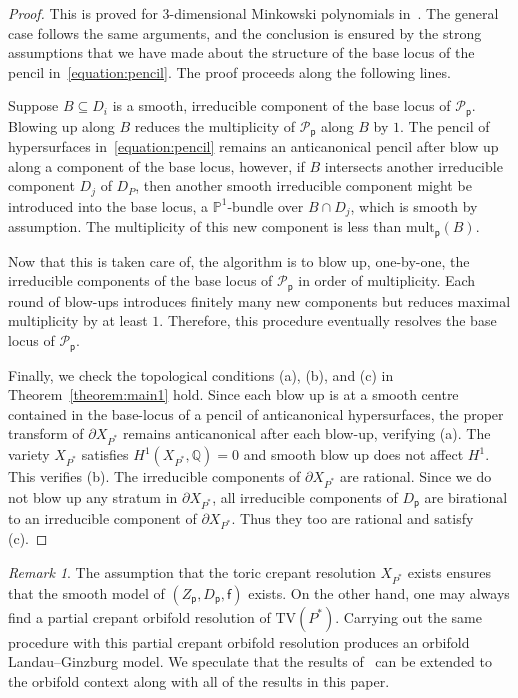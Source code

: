\documentclass[10pt]{amsart}
\numberwithin{equation}{section}
\theoremstyle{plain}
\theoremstyle{definition}
\theoremstyle{remark}
\newtheorem{remark}[theorem]{Remark}
\begin{document}
\begin{proof}
  This is proved for 3-dimensional Minkowski polynomials in~\cite{przyjalkowski2017compactification}. The general case follows the same arguments, and the conclusion is ensured by the strong assumptions that we have made about the structure of the base locus of the pencil in~\eqref{equation:pencil}. The proof proceeds along the following lines.

  Suppose \(B \subseteq D_i\) is a smooth, irreducible component of the base locus of \(\mathscr{P}_\mathsf{p}\). Blowing up along \(B\) reduces the multiplicity of \(\mathscr{P}_\mathsf{p}\) along \(B\) by \(1\). The pencil of hypersurfaces in~\eqref{equation:pencil} remains an anticanonical pencil after blow up along a component of the base locus, however, if \(B\) intersects another irreducible component \(D_j\) of \(D_P\), then another smooth irreducible component might be introduced into the base locus, a \(\mathbb{P}^1\)-bundle over \(B \cap D_j\), which is smooth by assumption. The multiplicity of this new component is less than \(\mathrm{mult}_\mathsf{p}(B)\).

  Now that this is taken care of, the algorithm is to blow up, one-by-one, the irreducible components of the base locus of \(\mathscr{P}_\mathsf{p}\) in order of multiplicity. Each round of blow-ups introduces finitely many new components but reduces maximal multiplicity by at least \(1\). Therefore, this procedure eventually resolves the base locus of \(\mathscr{P}_\mathsf{p}\).

  Finally, we check the topological conditions (a), (b), and (c) in Theorem~\ref{theorem:main1} hold. Since each blow up is at a smooth centre contained in the base-locus of a pencil of anticanonical hypersurfaces, the proper transform of \(\partial X_{P^*}\) remains anticanonical after each blow-up, verifying (a). The variety \(X_{P^*}\) satisfies \(H^1(X_{P^*},\mathbb{Q}) = 0\) and smooth blow up does not affect \(H^1\). This verifies (b). The irreducible components of \(\partial X_{P^*}\) are rational. Since we do not blow up any stratum in \(\partial X_{P^*}\), all irreducible components of \(D_\mathsf{p}\) are birational to an irreducible component of \(\partial X_{P^*}\). Thus they too are rational and satisfy (c).
\end{proof}

\begin{remark}
  The assumption that the toric crepant resolution \(X_{P^*}\) exists ensures that the smooth model of \((Z_\mathsf{p},D_\mathsf{p},\mathsf{f})\) exists. On the other hand, one may always find a partial crepant orbifold resolution of \(\mathrm{TV}(P^*)\). Carrying out the same procedure with this partial crepant orbifold resolution produces an orbifold Landau--Ginzburg model. We speculate that the results of~\cite{katzarkov2017bogomolov} can be extended to the orbifold context along with all of the results in this  paper.
\end{remark}
\end{document}
